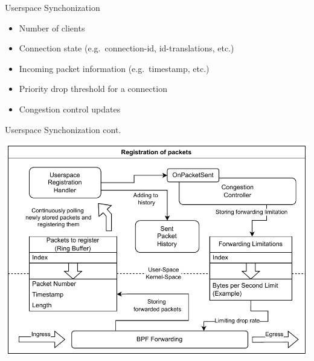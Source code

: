\documentclass[shortpres,aspectratio=43]{beamer}
\newlength{\mylength}
\begin{document}
\begin{frame}{Userspace Synchonization}
    \begin{minipage}{\textwidth}
        \begin{itemize}
            \item Number of clients
            \vspace{2\mylength}
            \item Connection state (e.g.~connection-id, id-translations, etc.)
            \vspace{2\mylength}
            \item Incoming packet information (e.g.~timestamp, etc.)
            \vspace{2\mylength}
            \item Priority drop threshold for a connection
            \vspace{2\mylength}
            \item Congestion control updates
        \end{itemize}
    \end{minipage}
\end{frame}

\begin{frame}{Userspace Synchonization cont.}
    \begin{minipage}{\textwidth}
        \centering
        \includegraphics[scale=0.6]{../figures/03_fast_relays/forward-registration.drawio.pdf}
    \end{minipage}
\end{frame}

\iffalse%
\end{document}
